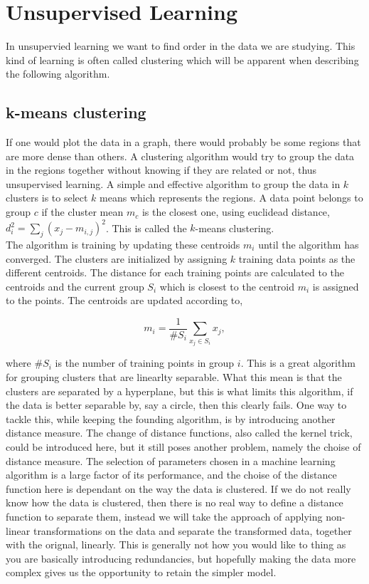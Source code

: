 \section{Unsupervised Learning}

In unsupervied learning we want to find order in the data we are studying. This kind of learning is often called clustering which will be apparent when describing the following algorithm.

\subsection{k-means clustering}

If one would plot the data in a graph, there would probably be some regions that are more dense than others. A clustering algorithm would try to group the data in the regions together without knowing if they are related or not, thus unsupervised learning. A simple and effective algorithm to group the data in $k$ clusters is to select $k$ means which represents the regions. A data point belongs to group $c$ if the cluster mean $m_c$ is the closest one, using euclidead distance, $d_i^2 = \sum_{j}(x_j-m_{i,j})^2 $. This is called the $k$-means clustering.\\

The algorithm is training by updating these centroids $m_i$ until the algorithm has converged. The clusters are initialized by assigning $k$ training data points as the different centroids. The distance for each training points are calculated to the centroids and the current group $S_i$ which is closest to the centroid $m_i$ is assigned to the points. The centroids are updated according to,

\begin{equation}
    m_i = \frac{1}{\#S_i}\sum_{x_j\in S_i}{x_j},
\end{equation}

where $\#S_i$ is the number of training points in group $i$. This is a great algorithm for grouping clusters that are linearlty separable. What this mean is that the clusters are separated by a hyperplane, but this is what limits this algorithm, if the data is better separable by, say a circle, then this clearly fails. One way to tackle this, while keeping the founding algorithm, is by introducing another distance measure. The change of distance functions, also called the kernel trick, could be introduced here, but it still poses another problem, namely the choise of distance measure. The selection of parameters chosen in a machine learning algorithm is a large factor of its performance, and the choise of the distance function here is dependant on the way the data is clustered. If we do not really know how the data is clustered, then there is no real way to define a distance function to separate them, instead we will take the approach of applying non-linear transformations on the data and separate the transformed data, together with the orignal, linearly. This is generally not how you would like to thing as you are basically introducing redundancies, but hopefully making the data more complex gives us the opportunity to retain the simpler model.

